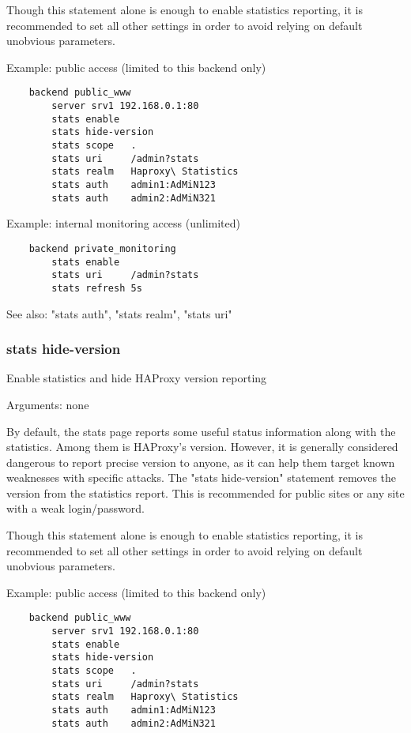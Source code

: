   Though this statement alone is enough to enable statistics reporting, it is
  recommended to set all other settings in order to avoid relying on default
  unobvious parameters.

  Example: public access (limited to this backend only)
  \begin{verbatim}
    backend public_www
        server srv1 192.168.0.1:80
        stats enable
        stats hide-version
        stats scope   .
        stats uri     /admin?stats
        stats realm   Haproxy\ Statistics
        stats auth    admin1:AdMiN123
        stats auth    admin2:AdMiN321
  \end{verbatim}
  
  Example: internal monitoring access (unlimited)
  \begin{verbatim}
    backend private_monitoring
        stats enable
        stats uri     /admin?stats
        stats refresh 5s
  \end{verbatim}

  See also: "stats auth", "stats realm", "stats uri"


\subsubsection{stats hide-version}


  Enable statistics and hide HAProxy version reporting
 
 
  Arguments: none

  By default, the stats page reports some useful status information along with
  the statistics. Among them is HAProxy's version. However, it is generally
  considered dangerous to report precise version to anyone, as it can help them
  target known weaknesses with specific attacks. The "stats hide-version"
  statement removes the version from the statistics report. This is recommended
  for public sites or any site with a weak login/password.

  Though this statement alone is enough to enable statistics reporting, it is
  recommended to set all other settings in order to avoid relying on default
  unobvious parameters.

  Example: public access (limited to this backend only)
  \begin{verbatim}
    backend public_www
        server srv1 192.168.0.1:80
        stats enable
        stats hide-version
        stats scope   .
        stats uri     /admin?stats
        stats realm   Haproxy\ Statistics
        stats auth    admin1:AdMiN123
        stats auth    admin2:AdMiN321
   \end{verbatim}

